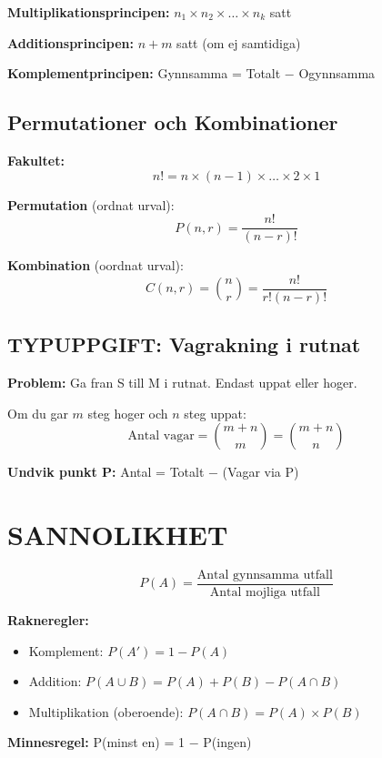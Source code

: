 \documentclass[11pt,a4paper]{article}
\begin{document}
\textbf{Multiplikationsprincipen:} $n_1 \times n_2 \times \ldots \times n_k$ satt

\textbf{Additionsprincipen:} $n + m$ satt (om ej samtidiga)

\textbf{Komplementprincipen:} Gynnsamma = Totalt $-$ Ogynnsamma

\subsection{Permutationer och Kombinationer}

\textbf{Fakultet:}
\[ n! = n \times (n-1) \times \ldots \times 2 \times 1 \]

\textbf{Permutation} (ordnat urval):
\[ P(n,r) = \frac{n!}{(n-r)!} \]

\textbf{Kombination} (oordnat urval):
\[ C(n,r) = \binom{n}{r} = \frac{n!}{r!(n-r)!} \]

\subsection{TYPUPPGIFT: Vagrakning i rutnat}

\textbf{Problem:} Ga fran S till M i rutnat. Endast uppat eller hoger.

\begin{tcolorbox}[title=Losning]
Om du gar $m$ steg hoger och $n$ steg uppat:
\[ \text{Antal vagar} = \binom{m+n}{m} = \binom{m+n}{n} \]
\end{tcolorbox}

\textbf{Undvik punkt P:} Antal = Totalt $-$ (Vagar via P)

\section{SANNOLIKHET}

\begin{tcolorbox}[title=Grundformel]
\[ P(A) = \frac{\text{Antal gynnsamma utfall}}{\text{Antal mojliga utfall}} \]
\end{tcolorbox}

\textbf{Rakneregler:}
\begin{itemize}
\item Komplement: $P(A') = 1 - P(A)$
\item Addition: $P(A \cup B) = P(A) + P(B) - P(A \cap B)$
\item Multiplikation (oberoende): $P(A \cap B) = P(A) \times P(B)$
\end{itemize}

\begin{tcolorbox}[colback=green!10, colframe=green!50!black]
\textbf{Minnesregel:} P(minst en) = 1 $-$ P(ingen)
\end{tcolorbox}
\end{document}
